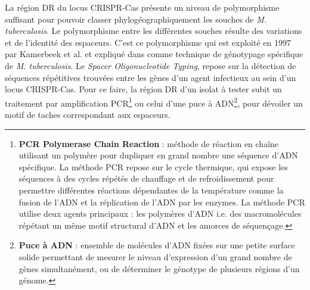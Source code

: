 \documentclass[twoside,a4paper,11pt,frenchb,openany]{report}
\begin{document}
La région DR du locus CRISPR-Cas présente un niveau de polymorphisme suffisant pour pouvoir classer phylogéographiquement les souches de \textit{M. tuberculosis}. Le polymorphisme entre les différentes souches résulte des variations et de l'identité des espaceurs. C'est ce polymorphisme qui est exploité en 1997 par Kamerbeek et al. et expliqué dans \cite{kamerbeek} comme technique de génotypage spécifique de \textit{M. tuberculosis}. Le \textit{Spacer Oligonucleotide Typing}, repose sur la détection de séquences répétitives trouvées entre les gènes d'un agent infectieux au sein d'un locus CRISPR-Cas. Pour ce faire, la région DR d'un isolat à tester subit un traitement par amplification PCR\footnote{\textbf{PCR Polymerase Chain Reaction} : méthode de réaction en chaîne utilisant un polymère pour dupliquer en grand nombre une séquence d'ADN spécifique. La méthode PCR repose sur le cycle thermique, qui expose les séquences à des cycles répétés de chauffage et de refroidissement pour permettre différentes réactions dépendantes de la température comme la fusion de l'ADN et la réplication de l'ADN par les enzymes. La méthode PCR utilise deux agents principaux : les polymères d'ADN i.e. des macromolécules répétant un même motif structural d'ADN et les amorces de séquençage.} ou celui d'une puce à ADN\footnote{\textbf{Puce à ADN} : ensemble de molécules d'ADN fixées sur une petite surface solide permettant de mesurer le niveau d'expression d'un grand nombre de gènes simultanément, ou de déterminer le génotype de plusieurs régions d'un génome.}, pour dévoiler un motif de taches correspondant aux espaceurs. 
\end{document}
